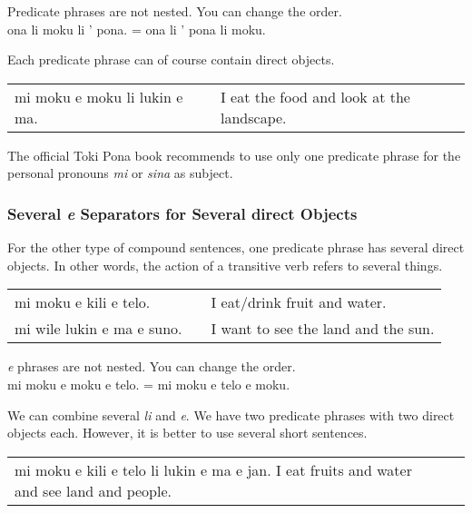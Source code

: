 Predicate phrases are not nested. You can change the order. \\
ona li moku li ' pona. = ona li ' pona li moku. 

Each predicate phrase can of course contain direct objects. 

\begin{supertabular}{p{5,5cm}|ll}
mi moku e moku li lukin e ma. && I eat the food and look at the landscape. \\
\end{supertabular} 

The official Toki Pona book recommends to use only one predicate phrase for the personal pronouns \textit{mi} or \textit{sina} as subject. 
%

\label{'multiple_e'}
\subsubsection*{Several \textit{e} Separators for Several direct Objects}
%
%
For the other type of compound sentences, one predicate phrase has several direct objects. 
In other words, the action of a transitive verb refers to several things. 

\begin{supertabular}{p{5,5cm}|ll}
mi moku e kili e telo. && I eat/drink fruit and water. \\
mi wile lukin e ma e suno. && I want to see the land and the sun. \\
\end{supertabular}
 
\textit{e} phrases are not nested. You can change the order. \\
mi moku e moku e telo. = mi moku e telo e moku. 

We can combine several \textit{li} and \textit{e}.
We have two predicate phrases with two direct objects each. 
However, it is better to use several short sentences. 

\begin{supertabular}{p{5,5cm}|ll}
mi moku e kili e telo li lukin e ma e jan. I eat fruits and water and see land and people. \\
\end{supertabular} 

%
\newpage
